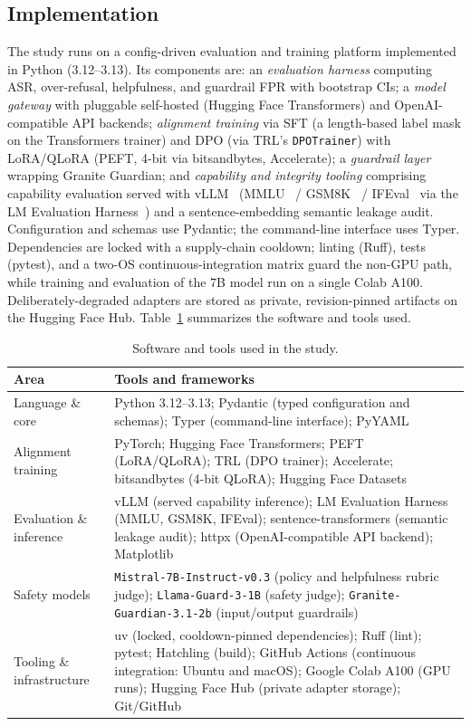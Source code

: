 \documentclass[11pt,a4paper]{article}
\newcommand{\code}[1]{\texttt{#1}}
\begin{document}
\subsection{Implementation}
The study runs on a config-driven evaluation and training platform implemented in Python
(3.12--3.13). Its components are: an \emph{evaluation harness} computing ASR, over-refusal,
helpfulness, and guardrail FPR with bootstrap CIs; a \emph{model gateway} with pluggable
self-hosted (Hugging Face Transformers) and OpenAI-compatible API backends; \emph{alignment
training} via SFT (a length-based label mask on the Transformers trainer) and DPO (via TRL's
\code{DPOTrainer}) with LoRA/QLoRA (PEFT, 4-bit via bitsandbytes, Accelerate); a
\emph{guardrail layer} wrapping Granite Guardian; and \emph{capability and integrity tooling}
comprising capability evaluation served with vLLM~\cite{vllm} (MMLU~\cite{mmlu} / GSM8K~\cite{gsm8k} /
IFEval~\cite{ifeval} via the LM Evaluation Harness~\cite{lmeval}) and a sentence-embedding
semantic leakage audit. Configuration and schemas use
Pydantic; the command-line interface uses Typer. Dependencies are locked with a supply-chain
cooldown; linting (Ruff), tests (pytest), and a two-OS continuous-integration matrix guard the
non-GPU path, while training and evaluation of the 7B model run on a single Colab A100.
Deliberately-degraded adapters are stored as private, revision-pinned artifacts on the
Hugging Face Hub. Table~\ref{tab:stack} summarizes the software and tools used.

\begin{table}[h]
\centering
\caption{Software and tools used in the study.}
\label{tab:stack}
\small
\begin{tabular}{@{}>{\raggedright\arraybackslash}p{} >{\raggedright\arraybackslash}p{}@{}}
\toprule
Area & Tools and frameworks \\
\midrule
Language \& core & Python 3.12--3.13; Pydantic (typed configuration and schemas); Typer (command-line interface); PyYAML \\
Alignment training & PyTorch; Hugging Face Transformers; PEFT (LoRA/QLoRA); TRL (DPO trainer); Accelerate; bitsandbytes (4-bit QLoRA); Hugging Face Datasets \\
Evaluation \& inference & vLLM (served capability inference); LM Evaluation Harness (MMLU, GSM8K, IFEval); sentence-transformers (semantic leakage audit); httpx (OpenAI-compatible API backend); Matplotlib \\
Safety models & \code{Mistral-7B-Instruct-v0.3} (policy and helpfulness rubric judge); \code{Llama-Guard-3-1B} (safety judge); \code{Granite-Guardian-3.1-2b} (input/output guardrails) \\
Tooling \& infrastructure & uv (locked, cooldown-pinned dependencies); Ruff (lint); pytest; Hatchling (build); GitHub Actions (continuous integration: Ubuntu and macOS); Google Colab A100 (GPU runs); Hugging Face Hub (private adapter storage); Git/GitHub \\
\bottomrule
\end{tabular}
\end{table}
\end{document}
